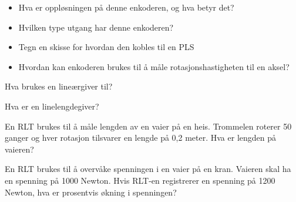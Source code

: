 \documentclass[12pt,a4paper]{article}
\def\oppgave{
		}
\begin{document}
\begin{itemize}
	\item Hva er oppløsningen på denne enkoderen, og hva betyr det?


	\item Hvilken type utgang har denne enkoderen?


	\item Tegn en skisse for hvordan den kobles til en PLS


	\item Hvordan kan enkoderen brukes til å måle rotasjonshastigheten til en aksel?


\end{itemize}

\vskip 5pt 
\vskip 2.5pt 
\oppgave{}%
\vskip 2.5pt 
Hva brukes en lineærgiver til?
\vskip 5pt 
\vskip 2.5pt 
\oppgave{}%
\vskip 2.5pt 
Hva er en linelengdegiver?
\vskip 5pt 
\vskip 2.5pt 
\oppgave{}%
\vskip 2.5pt 
En RLT brukes til å måle lengden av en vaier på en heis. Trommelen roterer 50 ganger og hver rotasjon tilsvarer en lengde på 0,2 meter. Hva er lengden på vaieren?
\vskip 5pt 
\vskip 2.5pt 
\oppgave{}%
\vskip 2.5pt 
En RLT brukes til å overvåke spenningen i en vaier på en kran. Vaieren skal ha en spenning på 1000 Newton. Hvis RLT-en registrerer en spenning på 1200 Newton, hva er prosentvis økning i spenningen?
\vskip 5pt 
\vskip 2.5pt 
\end{document}
